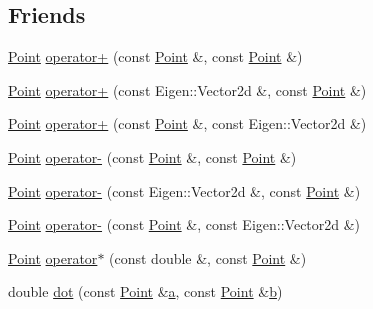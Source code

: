 \subsection*{Friends}
\begin{DoxyCompactItemize}
\item 
\hyperlink{classTspeed_1_1Geo_1_1Point}{Point} \hyperlink{classTspeed_1_1Geo_1_1Point_a379ea470d116d5ec7858c3b1c88051fa}{operator+} (const \hyperlink{classTspeed_1_1Geo_1_1Point}{Point} \&, const \hyperlink{classTspeed_1_1Geo_1_1Point}{Point} \&)
\item 
\hyperlink{classTspeed_1_1Geo_1_1Point}{Point} \hyperlink{classTspeed_1_1Geo_1_1Point_a2d0fd2bac2a91834b84eec591dc9df70}{operator+} (const Eigen\-::\-Vector2d \&, const \hyperlink{classTspeed_1_1Geo_1_1Point}{Point} \&)
\item 
\hyperlink{classTspeed_1_1Geo_1_1Point}{Point} \hyperlink{classTspeed_1_1Geo_1_1Point_a72670b27ed2e5bceb2da187f662a9e92}{operator+} (const \hyperlink{classTspeed_1_1Geo_1_1Point}{Point} \&, const Eigen\-::\-Vector2d \&)
\item 
\hyperlink{classTspeed_1_1Geo_1_1Point}{Point} \hyperlink{classTspeed_1_1Geo_1_1Point_adc0ae410968ebfcac79ebcf9d4eb3f5b}{operator-\/} (const \hyperlink{classTspeed_1_1Geo_1_1Point}{Point} \&, const \hyperlink{classTspeed_1_1Geo_1_1Point}{Point} \&)
\item 
\hyperlink{classTspeed_1_1Geo_1_1Point}{Point} \hyperlink{classTspeed_1_1Geo_1_1Point_ab0ba4548bf436133c76b37f3f870edbb}{operator-\/} (const Eigen\-::\-Vector2d \&, const \hyperlink{classTspeed_1_1Geo_1_1Point}{Point} \&)
\item 
\hyperlink{classTspeed_1_1Geo_1_1Point}{Point} \hyperlink{classTspeed_1_1Geo_1_1Point_ae88f602384d3cd03fade37ea2d7616bb}{operator-\/} (const \hyperlink{classTspeed_1_1Geo_1_1Point}{Point} \&, const Eigen\-::\-Vector2d \&)
\item 
\hyperlink{classTspeed_1_1Geo_1_1Point}{Point} \hyperlink{classTspeed_1_1Geo_1_1Point_a4796c5e216ac1d96d9b87714d1f9563c}{operator$\ast$} (const double \&, const \hyperlink{classTspeed_1_1Geo_1_1Point}{Point} \&)
\item 
double \hyperlink{classTspeed_1_1Geo_1_1Point_a3b8c7b9d0a9210b43bee0b3204c962d2}{dot} (const \hyperlink{classTspeed_1_1Geo_1_1Point}{Point} \&\hyperlink{load__and__plot__lamb_8m_aa875ab3a8009406dcace7fa71a0f490d}{a}, const \hyperlink{classTspeed_1_1Geo_1_1Point}{Point} \&\hyperlink{load__and__plot__lamb_8m_a21c7e548e910bb7ce7dcea81de72c8f7}{b})
\end{DoxyCompactItemize}
